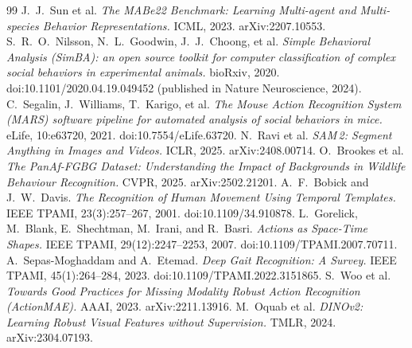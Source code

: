 \documentclass[11pt]{article}
\begin{document}
\begin{thebibliography}{99}
 J.~J.~Sun et al. \emph{The MABe22 Benchmark: Learning Multi-agent and Multi-species Behavior Representations.} ICML, 2023. arXiv:2207.10553.
 S.~R.~O.~Nilsson, N.~L.~Goodwin, J.~J.~Choong, et al. \emph{Simple Behavioral Analysis (SimBA): an open source toolkit for computer classification of complex social behaviors in experimental animals.} bioRxiv, 2020. doi:10.1101/2020.04.19.049452 (published in Nature Neuroscience, 2024).
 C.~Segalin, J.~Williams, T.~Karigo, et al. \emph{The Mouse Action Recognition System (MARS) software pipeline for automated analysis of social behaviors in mice.} eLife, 10:e63720, 2021. doi:10.7554/eLife.63720.
 N.~Ravi et al. \emph{SAM\,2: Segment Anything in Images and Videos.} ICLR, 2025. arXiv:2408.00714.
 O.~Brookes et al. \emph{The PanAf-FGBG Dataset: Understanding the Impact of Backgrounds in Wildlife Behaviour Recognition.} CVPR, 2025. arXiv:2502.21201.
 A.~F.~Bobick and J.~W.~Davis. \emph{The Recognition of Human Movement Using Temporal Templates.} IEEE TPAMI, 23(3):257--267, 2001. doi:10.1109/34.910878.
 L.~Gorelick, M.~Blank, E.~Shechtman, M.~Irani, and R.~Basri. \emph{Actions as Space-Time Shapes.} IEEE TPAMI, 29(12):2247--2253, 2007. doi:10.1109/TPAMI.2007.70711.
 A.~Sepas-Moghaddam and A.~Etemad. \emph{Deep Gait Recognition: A Survey.} IEEE TPAMI, 45(1):264--284, 2023. doi:10.1109/TPAMI.2022.3151865.
 S.~Woo et al. \emph{Towards Good Practices for Missing Modality Robust Action Recognition (ActionMAE).} AAAI, 2023. arXiv:2211.13916.
 M.~Oquab et al. \emph{DINOv2: Learning Robust Visual Features without Supervision.} TMLR, 2024. arXiv:2304.07193.
\end{thebibliography}
\end{document}
